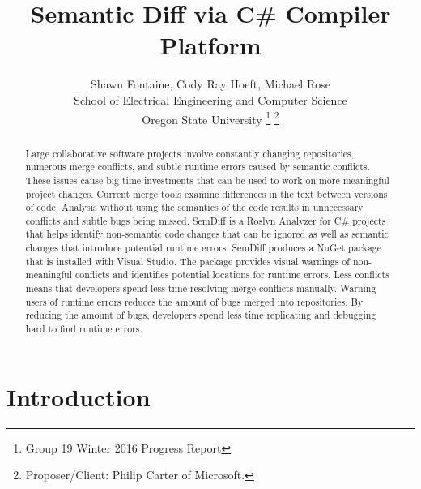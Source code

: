 \documentclass[draftclsnofoot,onecolumn]{IEEEtran}
\begin{document}
\lstset{style=cSharp}
\title{Semantic Diff via C\# Compiler Platform}

\author{Shawn Fontaine, Cody Ray Hoeft, Michael Rose\\
	School of Electrical Engineering and Computer Science\\
	Oregon State University
\thanks{Group 19 Winter 2016 Progress Report}
\thanks{Proposer/Client: Philip Carter of Microsoft.}}

\maketitle
{} %

\begin{abstract}
Large collaborative software projects involve constantly changing repositories, numerous merge conflicts, and subtle runtime errors caused by semantic conflicts. These issues cause big time investments that can be used to work on more meaningful project changes. Current merge tools examine differences in the text between versions of code. Analysis without using the semantics of the code results in unnecessary conflicts and subtle bugs being missed. SemDiff is a Roslyn Analyzer for C\# projects that helps identify non-semantic code changes that can be ignored as well as semantic changes that introduce potential runtime errors. SemDiff produces a NuGet package that is installed with Visual Studio. The package provides visual warnings of non-meaningful conflicts and identifies potential locations for runtime errors. Less conflicts means that developers spend less time resolving merge conflicts manually. Warning users of runtime errors reduces the amount of bugs merged into repositories. By reducing the amount of bugs, developers spend less time replicating and debugging hard to find runtime errors. 
\end{abstract}

\newpage
\setcounter{tocdepth}{2}
\tableofcontents


\newpage
{}

\section{Introduction}%
\end{document}
